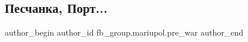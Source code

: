  
 
 
 
 

\subsection{Песчанка, Порт...}
\label{sec:16_02_2023.fb.fb_group.mariupol.pre_war.3.peschanka__port_}

\ifcmt
 author_begin
   author_id fb_group.mariupol.pre_war
 author_end
\fi
